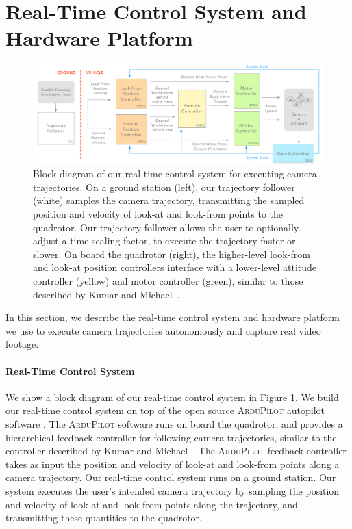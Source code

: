 \section{Real-Time Control System and Hardware Platform}\label{section:hw}

\begin{figure}[th!]
  \centering
  \includegraphics[width=5.5in]{images/2015_siggraph_asia/ControlAlgorithm}
  \caption{
Block diagram of our real-time control system for executing camera trajectories.
On a ground station (left), our trajectory follower (white) samples the camera trajectory, transmitting the sampled position and velocity of look-at and look-from points to the quadrotor.
Our trajectory follower allows the user to optionally adjust a time scaling factor, to execute the trajectory faster or slower.
On board the quadrotor (right), the higher-level look-from and look-at position controllers interface with a lower-level attitude controller (yellow) and motor controller (green), similar to those described by Kumar and Michael~\protect{}.
}
\label{figure:controlsystem}
\end{figure}

In this section, we describe the real-time control system and hardware platform we use to execute camera trajectories autonomously and capture real video footage.

\paragraph{Real-Time Control System}
We show a block diagram of our real-time control system in Figure \ref{figure:controlsystem}.
We build our real-time control system on top of the open source \textsc{ArduPilot} autopilot software \cite{apm:2015}. 
The \textsc{ArduPilot} software runs on board the quadrotor, and provides a hierarchical feedback controller for following camera trajectories, similar to the controller described by Kumar and Michael~. 
The \textsc{ArduPilot} feedback controller takes as input the position and velocity of look-at and look-from points along a camera trajectory.
Our real-time control system runs on a ground station.
Our system executes the user's intended camera trajectory by sampling the position and velocity of look-at and look-from points along the trajectory, and transmitting these quantities to the quadrotor.

